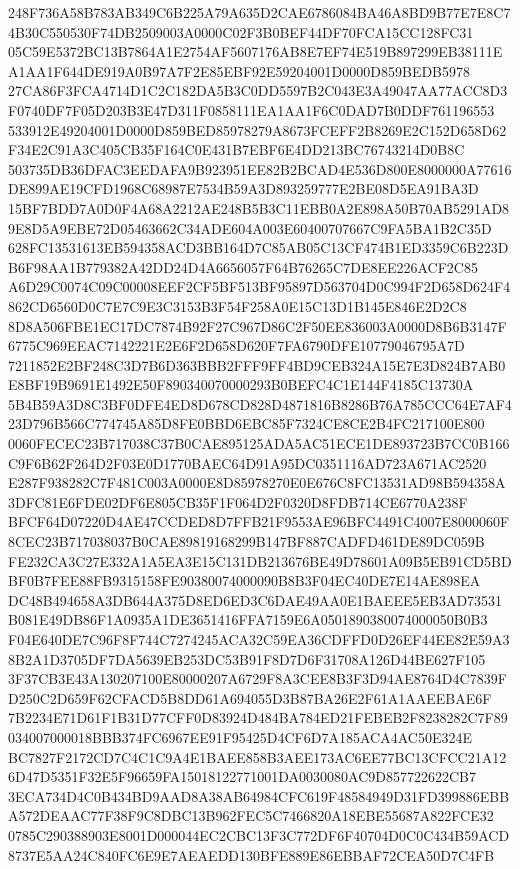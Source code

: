 \documentclass[UTF8,fontset=fandol,zihao=-4,a4paper]{ctexart}
\begin{document}
{{248F736A58B783AB349C6B225A79A635D2CAE6786084BA46A8BD9B77E7E8C74B30C550530F74DB2509003A0000C02F3B0BEF44DF70FCA15CC128FC31
05C59E5372BC13B7864A1E2754AF5607176AB8E7EF74E519B897299EB38111EA1AA1F644DE919A0B97A7F2E85EBF92E59204001D0000D859BEDB5978
27CA86F3FCA4714D1C2C182DA5B3C0DD5597B2C043E3A49047AA77ACC8D3F0740DF7F05D203B3E47D311F0858111EA1AA1F6C0DAD7B0DDF761196553
533912E49204001D0000D859BED85978279A8673FCEFF2B8269E2C152D658D62F34E2C91A3C405CB35F164C0E431B7EBF6E4DD213BC76743214D0B8C
503735DB36DFAC3EEDAFA9B923951EE82B2BCAD4E536D800E8000000A77616DE899AE19CFD1968C68987E7534B59A3D893259777E2BE08D5EA91BA3D
15BF7BDD7A0D0F4A68A2212AE248B5B3C11EBB0A2E898A50B70AB5291AD89E8D5A9EBE72D05463662C34ADE604A003E60400707667C9FA5BA1B2C35D
628FC13531613EB594358ACD3BB164D7C85AB05C13CF474B1ED3359C6B223DB6F98AA1B779382A42DD24D4A6656057F64B76265C7DE8EE226ACF2C85
A6D29C0074C09C00008EEF2CF5BF513BF95897D563704D0C994F2D658D624F4862CD6560D0C7E7C9E3C3153B3F54F258A0E15C13D1B145E846E2D2C8
8D8A506FBE1EC17DC7874B92F27C967D86C2F50EE836003A0000D8B6B3147F6775C969EEAC7142221E2E6F2D658D620F7FA6790DFE10779046795A7D
7211852E2BF248C3D7B6D363BBB2FFF9FF4BD9CEB324A15E7E3D824B7AB0E8BF19B9691E1492E50F890340070000293B0BEFC4C1E144F4185C13730A
5B4B59A3D8C3BF0DFE4ED8D678CD828D4871816B8286B76A785CCC64E7AF423D796B566C774745A85D8FE0BBD6EBC85F7324CE8CE2B4FC217100E800
0060FECEC23B717038C37B0CAE895125ADA5AC51ECE1DE893723B7CC0B166C9F6B62F264D2F03E0D1770BAEC64D91A95DC0351116AD723A671AC2520
E287F938282C7F481C003A0000E8D85978270E0E676C8FC13531AD98B594358A3DFC81E6FDE02DF6E805CB35F1F064D2F0320D8FDB714CE6770A238F
BFCF64D07220D4AE47CCDED8D7FFB21F9553AE96BFC4491C4007E8000060F8CEC23B717038037B0CAE89819168299B147BF887CADFD461DE89DC059B
FE232CA3C27E332A1A5EA3E15C131DB213676BE49D78601A09B5EB91CD5BDBF0B7FEE88FB9315158FE90380074000090B8B3F04EC40DE7E14AE898EA
DC48B494658A3DB644A375D8ED6ED3C6DAE49AA0E1BAEEE5EB3AD73531B081E49DB86F1A0935A1DE3651416FFA7159E6A0501890380074000050B0B3
F04E640DE7C96F8F744C7274245ACA32C59EA36CDFFD0D26EF44EE82E59A38B2A1D3705DF7DA5639EB253DC53B91F8D7D6F31708A126D44BE627F105
3F37CB3E43A130207100E80000207A6729F8A3CEE8B3F3D94AE8764D4C7839FD250C2D659F62CFACD5B8DD61A694055D3B87BA26E2F61A1AAEEBAE6F
7B2234E71D61F1B31D77CFF0D83924D484BA784ED21FEBEB2F8238282C7F89034007000018BBB374FC6967EE91F95425D4CF6D7A185ACA4AC50E324E
BC7827F2172CD7C4C1C9A4E1BAEE858B3AEE173AC6EE77BC13CFCC21A126D47D5351F32E5F96659FA15018122771001DA0030080AC9D857722622CB7
3ECA734D4C0B434BD9AAD8A38AB64984CFC619F48584949D31FD399886EBBA572DEAAC77F38F9C8DBC13B962FEC5C7466820A18EBE55687A822FCE32
0785C290388903E8001D000044EC2CBC13F3C772DF6F40704D0C0C434B59ACD8737E5AA24C840FC6E9E7AEAEDD130BFE889E86EBBAF72CEA50D7C4FB
}}
\end{document}
